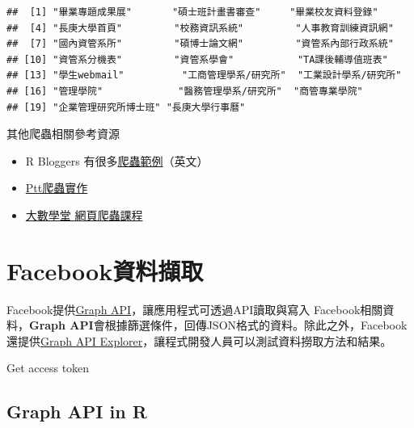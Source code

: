 \documentclass[]{book}
\newenvironment{Shaded}{\begin{snugshade}}{\end{snugshade}}
\newcommand{\KeywordTok}[1]{\textcolor[rgb]{0.13,0.29,0.53}{\textbf{{#1}}}}
\newcommand{\StringTok}[1]{\textcolor[rgb]{0.31,0.60,0.02}{{#1}}}
\newcommand{\CommentTok}[1]{\textcolor[rgb]{0.56,0.35,0.01}{\textit{{#1}}}}
\newcommand{\NormalTok}[1]{{#1}}
\providecommand{\tightlist}{%
  \setlength{\itemsep}{0pt}\setlength{\parskip}{0pt}}
\theoremstyle{definition}
\theoremstyle{definition}
\theoremstyle{remark}
\begin{document}
\begin{verbatim}
##  [1] "畢業專題成果展"       "碩士班計畫書審查"     "畢業校友資料登錄"    
##  [4] "長庚大學首頁"         "校務資訊系統"         "人事教育訓練資訊網"  
##  [7] "國內資管系所"         "碩博士論文網"         "資管系內部行政系統"  
## [10] "資管系分機表"         "資管系學會"           "TA課後輔導值班表"    
## [13] "學生webmail"          "工商管理學系/研究所"  "工業設計學系/研究所" 
## [16] "管理學院"             "醫務管理學系/研究所"  "商管專業學院"        
## [19] "企業管理研究所博士班" "長庚大學行事曆"
\end{verbatim}

其他爬蟲相關參考資源

\begin{itemize}
\tightlist
\item
  R Bloggers
  有很多\href{http://www.r-bloggers.com/?s=Web+Scraping}{爬蟲範例}（英文）
\item
  \href{http://bryannotes.blogspot.tw/2014/08/r-ptt-wantedsocial-network-analysis.html}{Ptt爬蟲實作}
\item
  \href{http://www.largitdata.com/course_list/1}{大數學堂 網頁爬蟲課程}
\end{itemize}

\section{Facebook資料擷取}\label{facebook}

Facebook提供\href{https://developers.facebook.com/docs/graph-api?locale=zh_TW}{Graph
API}，讓應用程式可透過API讀取與寫入 Facebook相關資料，\textbf{Graph
API}會根據篩選條件，回傳JSON格式的資料。除此之外，Facebook還提供\href{https://developers.facebook.com/tools/explorer/}{Graph
API Explorer}，讓程式開發人員可以測試資料撈取方法和結果。

Get access token

\subsection{Graph API in R}\label{graph-api-in-r}

\begin{Shaded}
\end{Shaded}
\end{document}
